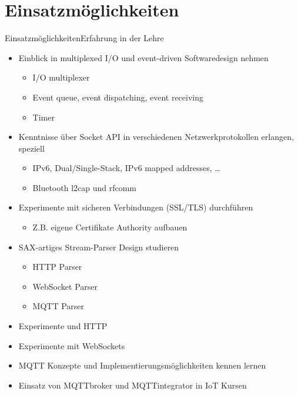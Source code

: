 ﻿

\part{Einsatzmöglichkeiten}
\begin{frame}{Einsatzmöglichkeiten}{Erfahrung in der Lehre}
  \begin{itemize}
    \item Einblick in multiplexed I/O und event-driven Softwaredesign nehmen
    \begin{itemize}
      \item I/O multiplexer
      \item Event queue, event dispatching, event receiving
      \item Timer
    \end{itemize}
    \item Kenntnisse über Socket API in verschiedenen Netzwerkprotokollen erlangen, speziell
    \begin{itemize}
      \item IPv6, Dual/Single-Stack, IPv6 mapped addresses, \ldots
      \item Bluetooth l2cap und rfcomm
    \end{itemize}
    \item Experimente mit sicheren Verbindungen (SSL/TLS) durchführen
    \begin{itemize}
      \item Z.B. eigene Certifikate Authority aufbauen
    \end{itemize}
    \item SAX-artiges Stream-Parser Design studieren
    \begin{itemize}
      \item HTTP Parser
      \item WebSocket Parser
      \item MQTT Parser
    \end{itemize}
    \item Experimente und HTTP
    \item Experimente mit WebSockets
    \item MQTT Konzepte und Implementierungsmöglichkeiten kennen lernen
    \item Einsatz von MQTTbroker und MQTTintegrator in IoT Kursen
  \end{itemize}
\end{frame}
